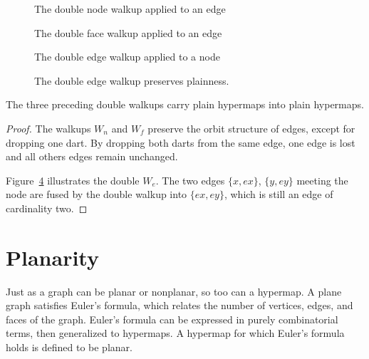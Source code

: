 \begin{figure}[htb]
\centering
{}
\caption{The double node walkup applied to an edge}
\label{fig:doublenode}
\end{figure}


\begin{figure}[htb]
\centering
{}
\caption{The double face walkup applied to an edge}
\label{fig:doubleface}
\end{figure}


\begin{figure}[htb]
\centering
{}
\caption{The double edge walkup applied to a node}
\label{fig:doubleedge}
\end{figure}

\begin{figure}[htb]
\centering
{}
\caption{The double edge walkup preserves plainness.}
\label{fig:doubleplain}
\end{figure}


\begin{lemma}\label{lemma:dwalk-planar}  
The three preceding double walkups carry plain
hypermaps into plain hypermaps.
\end{lemma}
%

\begin{proof} The walkups $W_n$ and $W_f$ preserve the orbit structure
  of edges, except for dropping one dart.  By dropping both darts from
  the same edge, one edge is lost and all others edges remain
  unchanged.

  Figure~\ref{fig:doubleplain} illustrates the double $W_e$.  The two
  edges $\{x,e x\}$, $\{y, e y\}$ meeting the node are fused by the
  double walkup into $\{e x, e y\}$, which is still an edge of cardinality
  two.
\end{proof}


\section{Planarity}
%
%

Just as a graph can be planar or nonplanar, so too can a hypermap.  A
plane graph satisfies Euler's formula, which relates the number of
vertices, edges, and faces of the graph.  Euler's formula can be
expressed in purely combinatorial terms, then generalized to
hypermaps.  A hypermap for which Euler's formula holds is defined to
be planar.  

